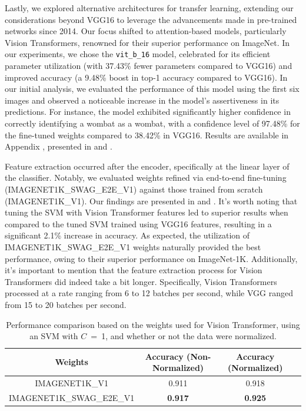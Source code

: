 Lastly, we explored alternative architectures for transfer learning, extending our considerations beyond VGG16 to leverage the advancements made in pre-trained networks since 2014. Our focus shifted to attention-based models, particularly Vision Transformers, renowned for their superior performance on ImageNet. In our experiments, we chose the \texttt{vit\_b\_16} model, celebrated for its efficient parameter utilization (with 37.43\% fewer parameters compared to VGG16) and improved accuracy (a 9.48\% boost in top-1 accuracy compared to VGG16).  In our initial analysis, we evaluated the performance of this model using the first six images and observed a noticeable increase in the model's assertiveness in its predictions. For instance, the model exhibited significantly higher confidence in correctly identifying a wombat as a wombat, with a confidence level of 97.48\% for the fine-tuned weights compared to 38.42\% in VGG16. Results are available in Appendix , presented in  and .


Feature extraction occurred after the encoder, specifically at the linear layer of the classifier. Notably, we evaluated weights refined via end-to-end fine-tuning (IMAGENET1K\_SWAG\_E2E\_V1) against those trained from scratch (IMAGENET1K\_V1). Our findings are presented in  and . It's worth noting that tuning the SVM with Vision Transformer features led to superior results when compared to the tuned SVM trained using VGG16 features, resulting in a significant 2.1\% increase in accuracy. As expected, the utilization of IMAGENET1K\_SWAG\_E2E\_V1 weights naturally provided the best performance, owing to their superior performance on ImageNet-1K. Additionally, it's important to mention that the feature extraction process for Vision Transformers did indeed take a bit longer. Specifically, Vision Transformers processed at a rate ranging from 6 to 12 batches per second, while VGG ranged from 15 to 20 batches per second.

\begin{table}[H]
    \centering
    \begin{tabular}{@{}cccc@{}}
        \toprule
        \textbf{Weights}  & \textbf{Accuracy (Non-Normalized)} & \textbf{Accuracy (Normalized)} \\
        \midrule \midrule
        IMAGENET1K\_V1            & 0.911                              & 0.918             \\
        IMAGENET1K\_SWAG\_E2E\_V1 & \textbf{0.917}                     & \textbf{0.925}    \\
        \bottomrule
    \end{tabular}
    \caption{Performance comparison based on the weights used for Vision Transformer, using an SVM with $C$~=~1, and whether or not the data were normalized.}
    \label{tab:vit_transferlearning}
\end{table}

